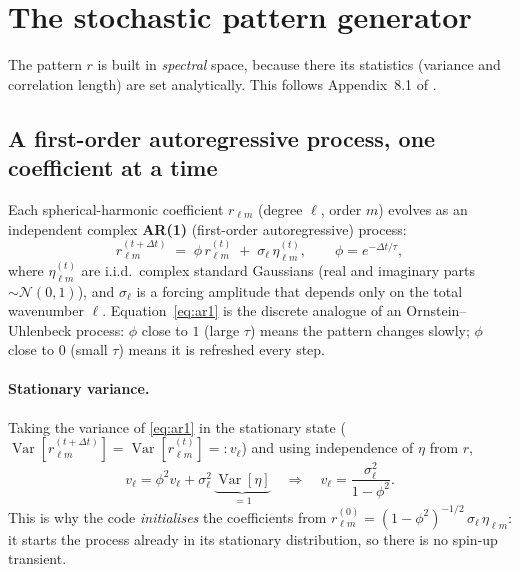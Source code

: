 \documentclass[11pt]{article}
\newcommand{\Var}{\operatorname{Var}}
\newcommand{\rlm}{r_{\ell m}}
\begin{document}
\section{The stochastic pattern generator}\label{sec:pattern}

The pattern $r$ is built in \emph{spectral} space, because there its statistics
(variance and correlation length) are set analytically. This follows Appendix~8.1
of \citet{palmer2009}.

\subsection{A first-order autoregressive process, one coefficient at a time}

Each spherical-harmonic coefficient $\rlm$ (degree $\ell$, order $m$) evolves as
an independent complex \textbf{AR(1)} (first-order autoregressive) process:
\begin{equation}
  \rlm^{(t+\Delta t)} \;=\; \phi\, \rlm^{(t)} \;+\; \sigma_\ell\, \eta_{\ell m}^{(t)},
  \qquad
  \phi = e^{-\Delta t/\tau},
  \label{eq:ar1}
\end{equation}
where $\eta_{\ell m}^{(t)}$ are i.i.d.\ complex standard Gaussians (real and
imaginary parts $\sim\mathcal N(0,1)$), and $\sigma_\ell$ is a forcing amplitude
that depends only on the total wavenumber $\ell$. Equation~\eqref{eq:ar1} is the
discrete analogue of an Ornstein--Uhlenbeck process: $\phi$ close to $1$ (large
$\tau$) means the pattern changes slowly; $\phi$ close to $0$ (small $\tau$) means
it is refreshed every step.

\paragraph{Stationary variance.} Taking the variance of \eqref{eq:ar1} in the
stationary state ($\Var[\rlm^{(t+\Delta t)}]=\Var[\rlm^{(t)}]=:v_\ell$) and using
independence of $\eta$ from $r$,
\begin{equation}
  v_\ell = \phi^2 v_\ell + \sigma_\ell^2\,\underbrace{\Var[\eta]}_{=1}
  \quad\Longrightarrow\quad
  v_\ell = \frac{\sigma_\ell^2}{1-\phi^2}.
  \label{eq:statvar}
\end{equation}
This is why the code \emph{initialises} the coefficients from
$\rlm^{(0)} = (1-\phi^2)^{-1/2}\,\sigma_\ell\,\eta_{\ell m}$: it starts the process
already in its stationary distribution, so there is no spin-up transient.
\end{document}
